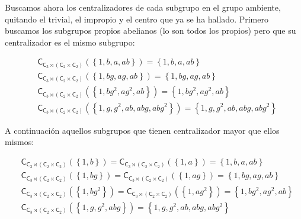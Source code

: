 \documentclass[12pt,a4paper,fleqn,spanish,final,openright]{extbook}
\theoremstyle{definition}
\theoremstyle{remark}
\begin{document}
Buscamos ahora los centralizadores de cada subgrupo en el grupo ambiente, quitando el trivial, el impropio y el centro que ya se ha hallado.
Primero buscamos los subgrupos propios abelianos (lo son todos los propios) pero que su centralizador es el mismo subgrupo:

\begin{align*}
&\mathsf{C}_{{\mathsf{C}_{3}}\rtimes({\mathsf{C}_{2}}\times{\mathsf{C}_{2}})}\left({\left\lbrace{1,b,a,ab}\right\rbrace}\right) = {\left\lbrace{1,b,a,ab}\right\rbrace}\\
&\mathsf{C}_{{\mathsf{C}_{3}}\rtimes({\mathsf{C}_{2}}\times{\mathsf{C}_{2}})}\left({\left\lbrace{1,bg,ag,ab}\right\rbrace}\right) = {\left\lbrace{1,bg,ag,ab}\right\rbrace}\\
&\mathsf{C}_{{\mathsf{C}_{3}}\rtimes({\mathsf{C}_{2}}\times{\mathsf{C}_{2}})}\left({\left\lbrace{1,bg^2,ag^2,ab}\right\rbrace}\right) = {\left\lbrace{1,bg^2,ag^2,ab}\right\rbrace}\\
&\mathsf{C}_{{\mathsf{C}_{3}}\rtimes({\mathsf{C}_{2}}\times{\mathsf{C}_{2}})}\left({\left\lbrace{1,g,g^2,ab,abg,abg^2}\right\rbrace}\right) = {\left\lbrace{1,g,g^2,ab,abg,abg^2}\right\rbrace}
\end{align*}

A continuación aquellos subgrupos que tienen centralizador mayor que ellos mismos:

\begin{align*}
&\mathsf{C}_{{\mathsf{C}_{3}}\rtimes
({\mathsf{C}_{2}}\times{\mathsf{C}_{2}})}\left({\left\lbrace{1,b}\right\rbrace}\right) =
\mathsf{C}_{{\mathsf{C}_{3}}\rtimes
({\mathsf{C}_{2}}\times{\mathsf{C}_{2}})}\left({\left\lbrace{1,a}\right\rbrace}\right) = 
{\left\lbrace{1,b,a,ab}\right\rbrace}\\
&\mathsf{C}_{{\mathsf{C}_{3}}\rtimes
({\mathsf{C}_{2}}\times{\mathsf{C}_{2}})}\left({\left\lbrace{1,bg}\right\rbrace}\right) =
\mathsf{C}_{{\mathsf{C}_{3}}
\rtimes({\mathsf{C}_{2}}\times{\mathsf{C}_{2}})}\left({\left\lbrace{1,ag}\right\rbrace}\right) = 
{\left\lbrace{1,bg,ag,ab}\right\rbrace}\\
&\mathsf{C}_{{\mathsf{C}_{3}}
\rtimes
({\mathsf{C}_{2}}\times{\mathsf{C}_{2}})}\left({\left\lbrace{1,bg^2}\right\rbrace}\right) = 
\mathsf{C}_{{\mathsf{C}_{3}}
\rtimes
({\mathsf{C}_{2}}\times{\mathsf{C}_{2}})}\left({\left\lbrace{1,ag^2}\right\rbrace}\right) = {\left\lbrace{1,bg^2,ag^2,ab}\right\rbrace}\\
&\mathsf{C}_{{\mathsf{C}_{3}}\rtimes({\mathsf{C}_{2}}\times{\mathsf{C}_{2}})}\left({\left\lbrace{1,g,g^2,abg}\right\rbrace}\right) = {\left\lbrace{1,g,g^2,ab,abg,abg^2}\right\rbrace}
\end{align*}
\end{document}
